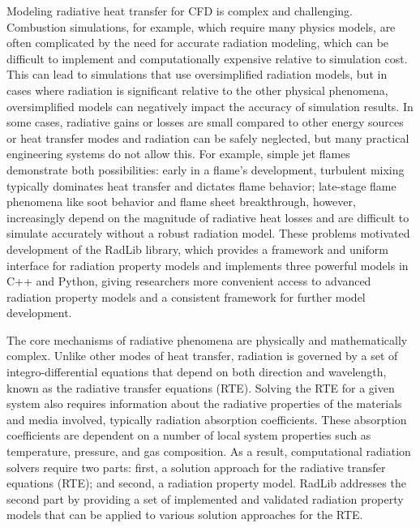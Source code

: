 \documentclass[preprint,12pt, a4paper]{elsarticle}
\begin{document}
Modeling radiative heat transfer for CFD is complex and challenging. Combustion simulations, for example, which require many physics models, are often complicated by the need for accurate radiation modeling, which can be difficult to implement and computationally expensive relative to simulation cost. This can lead to simulations that use oversimplified radiation models, but in cases where radiation is significant relative to the other physical phenomena, oversimplified models can negatively impact the accuracy of simulation results. In some cases, radiative gains or losses are small compared to other energy sources or heat transfer modes and radiation can be safely neglected, but many practical engineering systems do not allow this. For example, simple jet flames demonstrate both possibilities: early in a flame's development, turbulent mixing typically dominates heat transfer and dictates flame behavior; late-stage flame phenomena like soot behavior and flame sheet breakthrough, however, increasingly depend on the magnitude of radiative heat losses and are difficult to simulate accurately without a robust radiation model. These problems motivated development of the RadLib library, which provides a framework and uniform interface for radiation property models and implements three powerful models in C++ and Python, giving researchers more convenient access to advanced radiation property models and a consistent framework for further model development. 

The core mechanisms of radiative phenomena are physically and mathematically complex. Unlike other modes of heat transfer, radiation is governed by a set of integro-differential equations that depend on both direction and wavelength, known as the radiative transfer equations (RTE). Solving the RTE for a given system also requires information about the radiative properties of the materials and media involved, typically radiation absorption coefficients. These absorption coefficients are dependent on a number of local system properties such as temperature, pressure, and gas composition. As a result, computational radiation solvers require two parts: first, a solution approach for the radiative transfer equations (RTE); and second, a radiation property model. RadLib addresses the second part by providing a set of implemented and validated radiation property models that can be applied to various solution approaches for the RTE.

\end{document}
